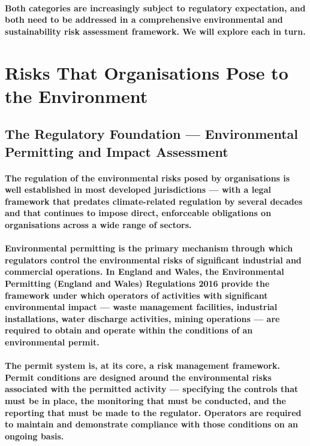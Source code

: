 \paragraph{Both categories are increasingly subject to regulatory expectation, and both need to be addressed in a comprehensive environmental and sustainability risk assessment framework. We will explore each in turn.}

\section{Risks That Organisations Pose to the Environment}

\subsection{The Regulatory Foundation — Environmental Permitting and Impact Assessment}
\paragraph{The regulation of the environmental risks posed by organisations is well established in most developed jurisdictions — with a legal framework that predates climate-related regulation by several decades and that continues to impose direct, enforceable obligations on organisations across a wide range of sectors.}
\paragraph{\textbf{Environmental permitting} is the primary mechanism through which regulators control the environmental risks of significant industrial and commercial operations. In England and Wales, the \textbf{Environmental Permitting (England and Wales) Regulations 2016} provide the framework under which operators of activities with significant environmental impact — waste management facilities, industrial installations, water discharge activities, mining operations — are required to obtain and operate within the conditions of an environmental permit.}
\paragraph{The permit system is, at its core, a risk management framework. Permit conditions are designed around the environmental risks associated with the permitted activity — specifying the controls that must be in place, the monitoring that must be conducted, and the reporting that must be made to the regulator. Operators are required to maintain and demonstrate compliance with those conditions on an ongoing basis.}
